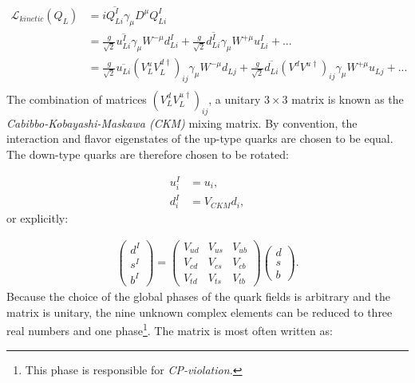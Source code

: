 \begin{equation}
\begin{split}
\mathcal{L}_{kinetic}\left(Q_L\right) &= i\overline{Q^I_{Li}}\gamma_\mu D^\mu Q^I_{Li} \\
&= \frac{g}{\sqrt{2}}\overline{u^I_{Li}} \gamma_\mu W^{-\mu} d^I_{Li} + \frac{g}{\sqrt{2}} \overline{d^I_{Li}} \gamma_\mu W^{+\mu} u^I_{Li} + ...\\
&= \frac{g}{\sqrt{2}}\overline{u_{Li}} \left(V^u_L V^{d\dagger}_L\right)_{ij} \gamma_\mu W^{-\mu} d_{Lj} + \frac{g}{\sqrt{2}} \overline{d_{Li}} \left(V^d V^{u\dagger}\right)_{ij} \gamma_\mu W^{+\mu} u_{Lj} + ...\\
\end{split}
\end{equation}
The combination of matrices $\left(V^d_L V^{u\dagger}_L\right)_{ij}$, a unitary $3 \times 3$ matrix is known as the \textit{Cabibbo-Kobayashi-Maskawa (CKM)} mixing matrix. By convention, the interaction and flavor eigenstates of the up-type quarks are chosen to be equal. The down-type quarks are therefore chosen to be rotated:

\begin{equation}
\begin{split}
u^I_i &= u_i,\\
d^I_i &= V_{CKM} d_i,
\end{split}
\end{equation}
or explicitly:


\begin{equation}
\begin{split}
\begin{pmatrix} d^I \\ s^I \\ b^I \end{pmatrix} = 
\begin{pmatrix} 
V_{ud} & V_{us} & V_{ub} \\
V_{cd} & V_{cs} & V_{cb} \\
V_{td} & V_{ts} & V_{tb}
\end{pmatrix}
\begin{pmatrix} d \\ s \\ b \end{pmatrix}.
\end{split}
\end{equation}
Because the choice of the global phases of the quark fields is arbitrary and the matrix is unitary, the nine unknown complex elements can be reduced to three real numbers and one phase\footnote{This phase is responsible for \textit{CP-violation.}}. The matrix is most often written as:


